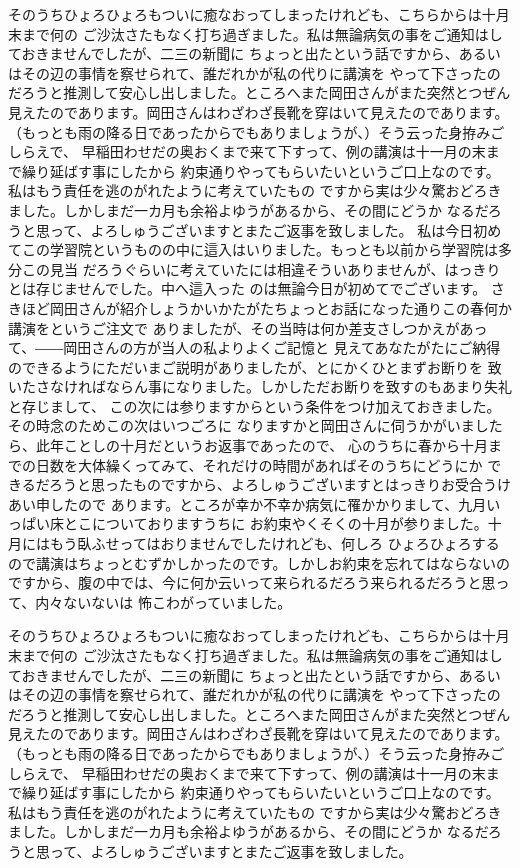 そのうちひょろひょろもついに癒なおってしまったけれども、こちらからは十月末まで何の
ご沙汰さたもなく打ち過ぎました。私は無論病気の事をご通知はしておきませんでしたが、二三の新聞に
ちょっと出たという話ですから、あるいはその辺の事情を察せられて、誰だれかが私の代りに講演を
やって下さったのだろうと推測して安心し出しました。ところへまた岡田さんがまた突然とつぜん
見えたのであります。岡田さんはわざわざ長靴を穿はいて見えたのであります。
（もっとも雨の降る日であったからでもありましょうが、）そう云った身拵みごしらえで、
早稲田わせだの奥おくまで来て下すって、例の講演は十一月の末まで繰り延ばす事にしたから
約束通りやってもらいたいというご口上なのです。私はもう責任を逃のがれたように考えていたもの
ですから実は少々驚おどろきました。しかしまだ一カ月も余裕よゆうがあるから、その間にどうか
なるだろうと思って、よろしゅうございますとまたご返事を致しました。
私は今日初めてこの学習院というものの中に這入はいりました。もっとも以前から学習院は多分この見当
だろうぐらいに考えていたには相違そういありませんが、はっきりとは存じませんでした。中へ這入った
のは無論今日が初めてでございます。
さきほど岡田さんが紹介しょうかいかたがたちょっとお話になった通りこの春何か講演をというご注文で
ありましたが、その当時は何か差支さしつかえがあって、――岡田さんの方が当人の私よりよくご記憶と
見えてあなたがたにご納得のできるようにただいまご説明がありましたが、とにかくひとまずお断りを
致いたさなければならん事になりました。しかしただお断りを致すのもあまり失礼と存じまして、
この次には参りますからという条件をつけ加えておきました。その時念のためこの次はいつごろに
なりますかと岡田さんに伺うかがいましたら、此年ことしの十月だというお返事であったので、
心のうちに春から十月までの日数を大体繰くってみて、それだけの時間があればそのうちにどうにか
できるだろうと思ったものですから、よろしゅうございますとはっきりお受合うけあい申したので
あります。ところが幸か不幸か病気に罹かかりまして、九月いっぱい床とこについておりますうちに
お約束やくそくの十月が参りました。十月にはもう臥ふせってはおりませんでしたけれども、何しろ
ひょろひょろするので講演はちょっとむずかしかったのです。しかしお約束を忘れてはならないの
ですから、腹の中では、今に何か云いって来られるだろう来られるだろうと思って、内々ないないは
怖こわがっていました。

そのうちひょろひょろもついに癒なおってしまったけれども、こちらからは十月末まで何の
ご沙汰さたもなく打ち過ぎました。私は無論病気の事をご通知はしておきませんでしたが、二三の新聞に
ちょっと出たという話ですから、あるいはその辺の事情を察せられて、誰だれかが私の代りに講演を
やって下さったのだろうと推測して安心し出しました。ところへまた岡田さんがまた突然とつぜん
見えたのであります。岡田さんはわざわざ長靴を穿はいて見えたのであります。
（もっとも雨の降る日であったからでもありましょうが、）そう云った身拵みごしらえで、
早稲田わせだの奥おくまで来て下すって、例の講演は十一月の末まで繰り延ばす事にしたから
約束通りやってもらいたいというご口上なのです。私はもう責任を逃のがれたように考えていたもの
ですから実は少々驚おどろきました。しかしまだ一カ月も余裕よゆうがあるから、その間にどうか
なるだろうと思って、よろしゅうございますとまたご返事を致しました。


